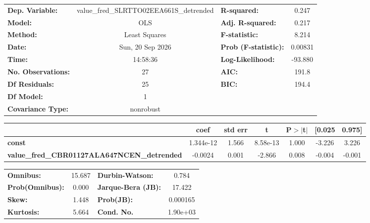 \begin{center}
\begin{tabular}{lclc}
\toprule
\textbf{Dep. Variable:}                             & value\_fred\_SLRTTO02EEA661S\_detrended & \textbf{  R-squared:         } &     0.247   \\
\textbf{Model:}                                     &                   OLS                   & \textbf{  Adj. R-squared:    } &     0.217   \\
\textbf{Method:}                                    &              Least Squares              & \textbf{  F-statistic:       } &     8.214   \\
\textbf{Date:}                                      &             Sun, 20 Sep 2026            & \textbf{  Prob (F-statistic):} &  0.00831    \\
\textbf{Time:}                                      &                 14:58:36                & \textbf{  Log-Likelihood:    } &   -93.880   \\
\textbf{No. Observations:}                          &                      27                 & \textbf{  AIC:               } &     191.8   \\
\textbf{Df Residuals:}                              &                      25                 & \textbf{  BIC:               } &     194.4   \\
\textbf{Df Model:}                                  &                       1                 & \textbf{                     } &             \\
\textbf{Covariance Type:}                           &                nonrobust                & \textbf{                     } &             \\
\bottomrule
\end{tabular}
\begin{tabular}{lcccccc}
                                                    & \textbf{coef} & \textbf{std err} & \textbf{t} & \textbf{P$> |$t$|$} & \textbf{[0.025} & \textbf{0.975]}  \\
\midrule
\textbf{const}                                      &    1.344e-12  &        1.566     &  8.58e-13  &         1.000        &       -3.226    &        3.226     \\
\textbf{value\_fred\_CBR01127ALA647NCEN\_detrended} &      -0.0024  &        0.001     &    -2.866  &         0.008        &       -0.004    &       -0.001     \\
\bottomrule
\end{tabular}
\begin{tabular}{lclc}
\textbf{Omnibus:}       & 15.687 & \textbf{  Durbin-Watson:     } &    0.784  \\
\textbf{Prob(Omnibus):} &  0.000 & \textbf{  Jarque-Bera (JB):  } &   17.422  \\
\textbf{Skew:}          &  1.448 & \textbf{  Prob(JB):          } & 0.000165  \\
\textbf{Kurtosis:}      &  5.664 & \textbf{  Cond. No.          } & 1.90e+03  \\
\bottomrule
\end{tabular}
\end{center}

